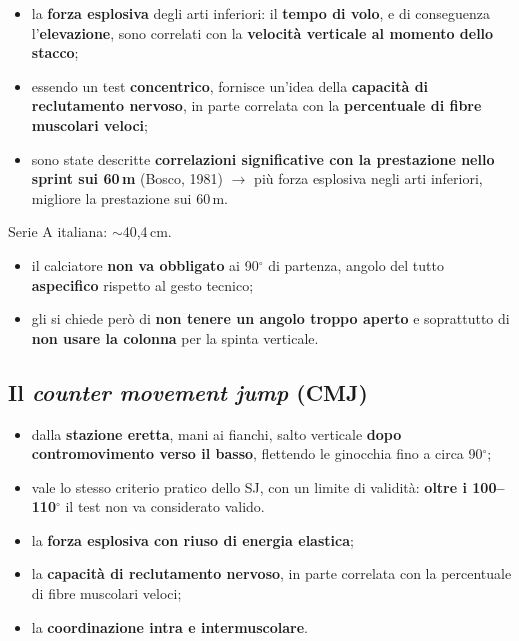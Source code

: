 \begin{itemize}
  \item la \textbf{forza esplosiva} degli arti inferiori: il \textbf{tempo di volo}, e di conseguenza
    l'\textbf{elevazione}, sono correlati con la \textbf{velocità verticale al momento dello stacco};
  \item essendo un test \textbf{concentrico}, fornisce un'idea della \textbf{capacità di reclutamento
    nervoso}, in parte correlata con la \textbf{percentuale di fibre muscolari veloci};
  \item sono state descritte \textbf{correlazioni significative con la prestazione nello sprint sui
    60\,m} (Bosco, 1981) $\rightarrow$ più forza esplosiva negli arti inferiori, migliore la
    prestazione sui 60\,m.
\end{itemize}

Serie A italiana: $\sim$40,4\,cm.

\begin{itemize}
  \item il calciatore \textbf{non va obbligato} ai 90$^\circ$ di partenza, angolo del tutto
    \textbf{aspecifico} rispetto al gesto tecnico;
  \item gli si chiede però di \textbf{non tenere un angolo troppo aperto} e soprattutto di
    \textbf{non usare la colonna} per la spinta verticale.
\end{itemize}

\subsection{Il \texorpdfstring{\textit{counter movement jump}}{counter movement jump} (CMJ)}

\begin{itemize}
  \item dalla \textbf{stazione eretta}, mani ai fianchi, salto verticale \textbf{dopo
    contromovimento verso il basso}, flettendo le ginocchia fino a circa 90$^\circ$;
  \item vale lo stesso criterio pratico dello SJ, con un limite di validità: \textbf{oltre i
    100--110$^\circ$} il test non va considerato valido.
\end{itemize}

\begin{itemize}
  \item la \textbf{forza esplosiva con riuso di energia elastica};
  \item la \textbf{capacità di reclutamento nervoso}, in parte correlata con la percentuale di fibre
    muscolari veloci;
  \item la \textbf{coordinazione intra e intermuscolare}.
\end{itemize}


